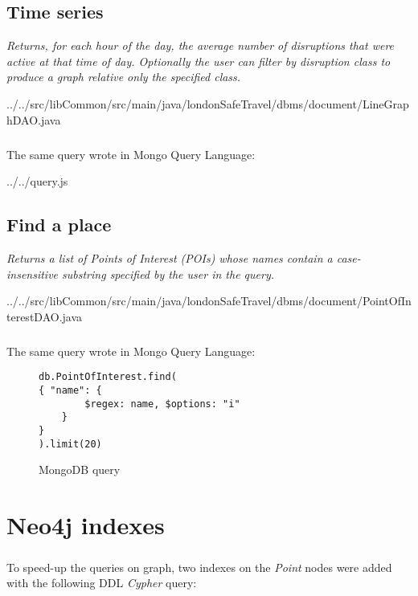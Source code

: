 \section{Time series}
\textit{Returns, for each hour of the day, the average number of disruptions that were active at that time of day. Optionally the user can filter by disruption class to produce a graph relative only the specified class.}


{../../src/libCommon/src/main/java/londonSafeTravel/dbms/document/LineGraphDAO.java}

\paragraph{}
The same query wrote in Mongo Query Language:

{../../query.js}


\section{Find a place}
\textit{Returns a list of Points of Interest (POIs) whose names contain a case-insensitive substring specified by the user in the query.}


{../../src/libCommon/src/main/java/londonSafeTravel/dbms/document/PointOfInterestDAO.java}
\paragraph{}
The same query wrote in Mongo Query Language:
\begin{figure}[H]
	\begin{lstlisting}
db.PointOfInterest.find(
{ "name": {
		$regex: name, $options: "i"
	}
}
).limit(20)
	\end{lstlisting}
	\caption{MongoDB query}
\end{figure}


\chapter{Neo4j indexes}

\paragraph{}
To speed-up the queries on graph, two indexes on the \textit{Point} nodes were added with the following DDL \textit{Cypher} query:

